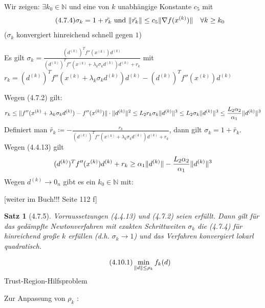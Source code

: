 \documentclass[ngerman,halfparskip]{scrartcl}
\DeclarePairedDelimiter{\norm}{\lVert}{\rVert}
\newtheorem*{satz}{Satz}
\theoremstyle{definition}
\newcommand*{\N}{\mathbb{N}}      %
\begin{document}
Wir zeigen: $\exists k_0\in \N$ und eine von $k$ unabhängige Konstante $c_5$ mit 
\begin{gather*}\tag{4.7.4}
\sigma_k=1+\tilde{r_k} \text{ und } \norm{\tilde{r_k}}\leq c_5\norm{\nabla f (x^{(k)})} \quad \forall k\geq k_0
\end{gather*}
 ($\sigma_k$ konvergiert hinreichend schnell gegen $1$)
 
 Es gilt $\sigma_k=\frac{(d^{(k)})^Tf''(x^{(k)}) d^{(k)}}{(d^{(k)})^Tf''(x^{(k)}+\lambda_k \sigma_k d^{(k)}) d^{(k)}+r_k}$ mit $r_k=(d^{(k)})^Tf''(x^{(k)}+\lambda_k \sigma_k d^{(k)}) d^{(k)}-(d^{(k)})^Tf''(x^{(k)}) d^{(k)}$
 
 Wegen (4.7.2) gilt:
 $$r_k\leq \norm{f''(x^{(k)}+\lambda_k \sigma_k d^{(k)})-f''(x^{(k)}) }\cdot \norm{d^{(k)}}^2 \leq L_2r_k\sigma_k\norm{d^{(k)}}^3 \leq L_2\sigma_k\norm{d^{(k)}}^3\leq \frac{L_2\alpha_2}{\alpha_1}\norm{d^{(k)}}^3$$
 Definiert man $\tilde{r_k}\coloneqq -\frac{r_k}{(d^{(k)})^Tf''(x^{(k)}+\lambda_k \sigma_k d^{(k)}) d^{(k)}+r_k}$, dann gilt $\sigma_k=1+\tilde{r_k}$. Wegen (4.4.13) gilt
 $$(d^{(k)})^Tf''(x^{(k)}) d^{(k)}+r_k\geq \alpha_1 \norm{d^{(k)}}-\frac{L_2\alpha_2}{\alpha_1}\norm{d^{(k)}}^3$$
 Wegen $d^{(k)}\rightarrow 0_n$ gibt es ein $k_0\in\N $ mit:
 
 [weiter im Buch!!! Seite 112 f]


\begin{satz}[4.7.5]
Vorraussetzungen (4.4.13) und (4.7.2) seien erfüllt. Dann gilt für das gedämpfte Newtonverfahren mit exakten Schrittweiten $\sigma_k$ die (4.7.4) für hinreichend große $k$ erfüllen (d.h. $\sigma_k\rightarrow 1$) und das Verfahren konvergiert lokarl quadratisch.
\end{satz}



























\begin{gather*}\tag{4.10.1}
\min\limits_{\norm{d}\leq \rho_k}f_k(d)
\end{gather*}
Trust-Region-Hilfsproblem

Zur Anpassung von $\rho_k$ :
\end{document}
